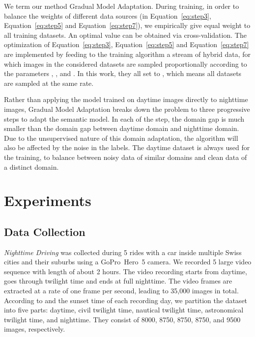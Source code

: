 \documentclass[letterpaper, 10 pt, conference]{ieeeconf}
\begin{document}
We term our method Gradual Model Adaptation. During training, in order to balance the weights of different data sources (in Equation~\ref{eq:step3}, Equation~\ref{eq:step5} and Equation~\ref{eq:step7}), we empirically give equal weight to all training datasets. An optimal value can be obtained via cross-validation. The optimization of Equation~\ref{eq:step3}, Equation~\ref{eq:step5} and Equation~\ref{eq:step7} are implemented by feeding to the training algorithm a stream of hybrid data, for which images in the considered datasets are sampled proportionally according to the parameters , , and . In this work, they all set to , which means all datasets are sampled at the same rate.

Rather than applying the model trained on daytime images directly to nighttime images, Gradual Model Adaptation breaks down the problem to three progressive steps to adapt the semantic model. In each of the step, the domain gap is much smaller than the domain gap between daytime domain and nighttime domain. Due to the unsupervised nature of this domain adaptation, the algorithm will also be affected by the noise in the labels. The daytime dataset  is always used for the training, to balance between noisy data of similar domains and clean data of a distinct domain. 

























\section{Experiments} 
\label{sec:experiment} 

\subsection{Data Collection}
\emph{Nighttime Driving} was collected during 5 rides with a car inside multiple Swiss cities and their suburbs using a GoPro~Hero~5 camera. We recorded 5 large video sequence with length of about 2 hours. The video recording starts from daytime, goes through twilight time and ends at full nighttime. The video frames are extracted at a rate of one frame per second, leading to 35,000 images in total. According to \cite{twilight:definition} and the sunset time of each recording day, we partition the dataset into five parts: daytime, civil twilight time, nautical twilight time, astronomical twilight time, and nighttime. They consist of 8000, 8750, 8750, 8750, and 9500 images, respectively.  
\end{document}
